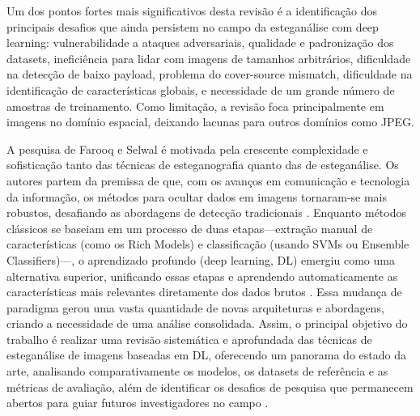 \documentclass[12pt]{article}
\begin{document}
Um dos pontos fortes mais significativos desta revisão é a identificação dos
principais desafios que ainda persistem no campo da esteganálise com deep
learning: vulnerabilidade a ataques adversariais, qualidade e padronização dos
datasets, ineficiência para lidar com imagens de tamanhos arbitrários,
dificuldade na detecção de baixo payload, problema do cover-source mismatch,
dificuldade na identificação de características globais, e necessidade de um
grande número de amostras de treinamento. Como limitação, a revisão foca
principalmente em imagens no domínio espacial, deixando lacunas para outros
domínios como JPEG.

A pesquisa de Farooq e Selwal \cite{farooq2023systematic} é motivada pela
crescente complexidade e sofisticação tanto das técnicas de esteganografia
quanto das de esteganálise. Os autores partem da premissa de que, com os
avanços em comunicação e tecnologia da informação, os métodos para ocultar
dados em imagens tornaram-se mais robustos, desafiando as abordagens de
detecção tradicionais \cite{farooq2023systematic}. Enquanto métodos clássicos
se baseiam em um processo de duas etapas—extração manual de características
(como os Rich Models) e classificação (usando SVMs ou Ensemble Classifiers)—, o
aprendizado profundo (deep learning, DL) emergiu como uma alternativa superior,
unificando essas etapas e aprendendo automaticamente as características mais
relevantes diretamente dos dados brutos \cite{farooq2023systematic}. Essa
mudança de paradigma gerou uma vasta quantidade de novas arquiteturas e
abordagens, criando a necessidade de uma análise consolidada. Assim, o
principal objetivo do trabalho é realizar uma revisão sistemática e aprofundada
das técnicas de esteganálise de imagens baseadas em DL, oferecendo um panorama
do estado da arte, analisando comparativamente os modelos, os datasets de
referência e as métricas de avaliação, além de identificar os desafios de
pesquisa que permanecem abertos para guiar futuros investigadores no campo
\cite{farooq2023systematic}.
\end{document}
